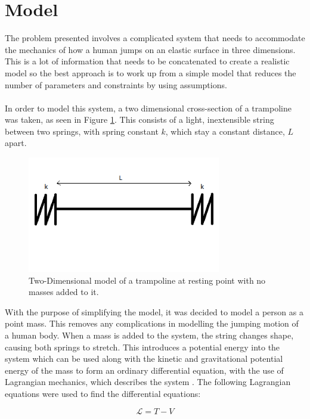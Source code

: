 \section{Model}

\noindent The problem presented involves a complicated system that needs to accommodate the mechanics of how a human jumps on an elastic surface in three dimensions. This is a lot of information that needs to be concatenated to create a realistic model so the best approach is to work up from a simple model that reduces the number of parameters and constraints by using assumptions.
\\
\\
\noindent In order to model this system, a two dimensional cross-section of a trampoline was taken, as seen in Figure \ref{fig:flattramp}. This consists of a light, inextensible string between two springs, with spring constant $k$, which stay a constant distance, $L$ apart. 

\begin{figure}[H]
	\centering
	\includegraphics[width=0.6\linewidth, height=2in]{ill1.png}
	\caption{Two-Dimensional model of a trampoline at resting point with no masses added to it.}\label{fig:flattramp}
\end{figure}

\noindent With the purpose of simplifying the model, it was decided to model a person as a point mass. This removes any complications in modelling the jumping motion of a human body. When a mass is added to the system, the string changes shape, causing both springs to stretch. This introduces a potential energy into the system which can be used along with the kinetic and gravitational potential energy of the mass to form an ordinary differential equation, with the use of Lagrangian mechanics, which describes the system \cite{lagrange}. The following Lagrangian equations were used to find the differential equations: 

\begin{equation}
\mathcal{L} = T - V
\end{equation}\label{lagrangeeq1}

